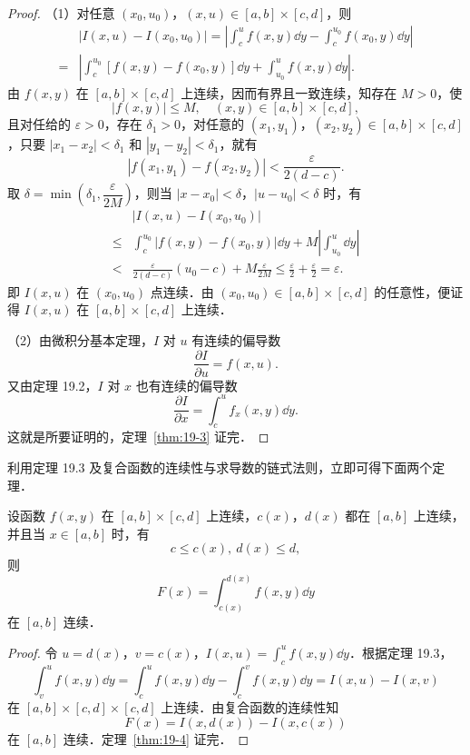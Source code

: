 \begin{proof}
（1）对任意 $(x_{0},u_{0})$，$(x,u)\in[a,b]\times[c,d]$，则
\[
\begin{aligned}
&|I(x,u)-I(x_{0},u_{0})|=\left|\int_{c}^{u}f(x,y)\dd y-\int_{c}^{u_{0}}f(x_{0},y)\dd y\right|\\
={}&\left|\int_{c}^{u_{0}}\left[f(x,y)-f(x_{0},y)\right]\dd y+\int_{u_{0}}^{u}f(x,y)\dd y\right|.
\end{aligned}
\]
由 $f(x,y)$ 在 $[a,b]\times[c,d]$ 上连续，因而有界且一致连续，知存在 $M>0$，使
\[
|f(x,y)|\leqslant M,\quad(x,y)\in[a,b]\times[c,d],
\]
且对任给的 $\varepsilon>0$，存在 $\delta_{1}>0$，对任意的 $(x_{1},y_{1})$，$(x_{2},y_{2})\in[a,b]\times[c,d]$，只要 $|x_{1}-x_{2}|<\delta_{1}$ 和 $|y_{1}-y_{2}|<\delta_{1}$，就有
\[
|f(x_{1},y_{1})-f(x_{2},y_{2})|<\frac{\varepsilon}{2(d-c)}.
\]
取 $\delta=\min\left(\delta_{1},\dfrac{\varepsilon}{2M}\right)$，则当 $|x-x_{0}|<\delta$，$|u-u_{0}|<\delta$ 时，有
\[
\begin{aligned}
&|I(x,u)-I(x_{0},u_{0})|\\
\leqslant{}&\int_{c}^{u_{0}}|f(x,y)-f(x_{0},y)|\dd y+M\left|\int_{u_{0}}^{u}\dd y\right|\\
<{}&\frac{\varepsilon}{2(d-c)}(u_{0}-c)+M\frac{\varepsilon}{2M}\leqslant\frac{\varepsilon}{2}+\frac{\varepsilon}{2}=\varepsilon.
\end{aligned}
\]
即 $I(x,u)$ 在 $(x_{0},u_{0})$ 点连续．由 $(x_{0},u_{0})\in[a,b]\times[c,d]$ 的任意性，便证得 $I(x,u)$ 在 $[a,b]\times[c,d]$ 上连续．

（2）由微积分基本定理，$I$ 对 $u$ 有连续的偏导数
\[
\frac{\partial I}{\partial u}=f(x,u).
\]
又由定理 19.2，$I$ 对 $x$ 也有连续的偏导数
\[
\frac{\partial I}{\partial x}=\int_{c}^{u}f_{x}(x,y)\dd y.
\]
这就是所要证明的，定理~\ref{thm:19-3} 证完．
\end{proof}

利用定理 19.3 及复合函数的连续性与求导数的链式法则，立即可得下面两个定理．

\begin{theorem}\label{thm:19-4}
设函数 $f(x,y)$ 在 $[a,b]\times[c,d]$ 上连续，$c(x)$，$d(x)$ 都在 $[a,b]$ 上连续，并且当 $x\in[a,b]$ 时，有
\[
c\leqslant c(x),\ d(x)\leqslant d,
\]
则
\[
F(x)=\int_{c(x)}^{d(x)}f(x,y)\dd y
\]
在 $[a,b]$ 连续．
\end{theorem}

\begin{proof}
令 $u=d(x)$，$v=c(x)$，$I(x,u)=\int_{c}^{u}f(x,y)\dd y$．根据定理 19.3，
\[
\int_{v}^{u}f(x,y)\dd y=\int_{c}^{u}f(x,y)\dd y-\int_{c}^{v}f(x,y)\dd y=I(x,u)-I(x,v)
\]
在 $[a,b]\times[c,d]\times[c,d]$ 上连续．由复合函数的连续性知
\[
F(x)=I(x,d(x))-I(x,c(x))
\]
在 $[a,b]$ 连续．定理~\ref{thm:19-4} 证完．
\end{proof}


